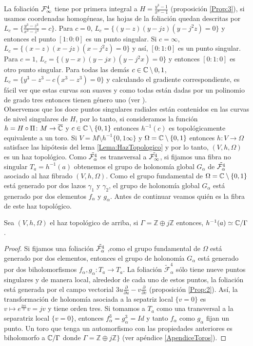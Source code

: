 La foliación $\Fol[4]{\infty}$ tiene por primera integral a $H=\tfrac{y^{3}-1}{x^{3}-1}$ (proposición \ref{Prop:3}), si usamos coordenadas homogéneas, las hojas de la foliación quedan descritas por $L_{c}=\{\tfrac{y^{3}-z^{3}}{x^{3}-z^{3}}=c\}$. Para $c=0$, $L_{c}=\{(y-z)(y-jz)(y-j^{2}z)=0\}$ y entonces el punto $[1:0:0]$ es un punto singular. Si $c=\infty$, $L_{c}=\{(x-z)(x-jz)(x-j^{2}z)=0\}$ y así, $[0:1:0]$ es un punto singular. Para $c=1$, $L_{c}=\{(y-x)(y-jx)(y-j^{2}x)=0\}$ y entonces $[0:1:0]$ es otro punto singular. Para todas las demás $c\in\C\setminus{0,1}$, $L_{c}=\{y^{3}-z^{3}-c(x^{3}-z^{3})=0\}$ y calculando el gradiente correspondiente, es fácil ver que estas curvas son suaves y como todas están dadas por un polinomio de grado tres entonces tienen género uno (ver \cite{FischerGerd}).\\

Observemos que los doce puntos singulares radiales están contenidos en las curvas de nivel singulares de $H$, por lo tanto, si consideramos la función $h=H\circ\Pi\colon M\rightarrow\overline{\C}$ y $c\in\C\setminus\{0,1\}$ entonces $h^{-1}(c)$ es topológicamente equivalente a un toro. Si $V=M\setminus h^{-1}\{0,1\infty\}$ y $\Omega=\C\setminus\{0,1\}$ entonces $h\colon V\rightarrow\Omega$ satisface las hipótesis del lema \ref{Lema:HazTopologico} y por lo tanto, $(V,h,\Omega)$ es un haz topológico. Como $\tilde{\Foli_{\alpha}^{4}}$ es transversal a $\tilde{\Foli_{\infty}^{4}}$, si fijamos una fibra no singular $T_{a}=h^{-1}(a)$ obtenemos el grupo de holonomía global $G_{\alpha}$ de $\tilde{\Foli_{\alpha}^{4}}$ asociado al haz fibrado $(V,h,\Omega)$. Como el grupo fundamental de $\Omega=\C\setminus\{0,1\}$ está generado por dos lazos $\gamma_{1}$ y $\gamma_{2}$, el grupo de holonomía global $G_{\alpha}$ está generado por dos elementos $f_{\alpha}$ y $g_{\alpha}$. Antes de continuar veamos quién es la fibra de este haz topológico.
\begin{Proposicion}
\label{Prop:FibraDelHaz}
Sea $(V,h,\Omega)$ el haz topológico de arriba, si $\Gamma=\mathbb{Z}\oplus j\mathbb{Z}$ entonces, $h^{-1}(a)\simeq\C/\Gamma$.
\end{Proposicion}
\begin{proof}
Si fijamos una foliación $\tilde{\Foli_{\alpha}^{4}}$ ,como el grupo fundamental de $\Omega$ está generado por dos elementos, entonces  el grupo de holonomía $G_{\alpha}$ está generado por dos biholomorfismos $f_{\alpha},g_{\alpha}\colon T_{a}\rightarrow T_{a}$. La foliación $\tilde{\mathcal{F}}_{\alpha}^{4}$ sólo tiene nueve puntos singulares y de manera local, alrededor de cada uno de estos puntos, la foliación está generada por el campo vectorial $3u\tfrac{\partial}{\partial u}-v\tfrac{\partial}{\partial v}$ (proposición \ref{Prop:2}). Así, la transformación de holonomía asociada a la sepatriz local $\{v=0\}$ es $v\mapsto e^{\tfrac{2\pi i}{3}}v=jv$ y tiene orden tres. Si tomamos a $T_{a}$ como una transversal a la separatriz local $\{v=0\}$, entonces $f_{\alpha}^{3}=g_{\alpha}^{3}=Id$ y tanto $f_{\alpha}$ como $g_{\alpha}$ fijan un punto. Un toro que tenga un automorfismo con las propiedades anteriores es biholomorfo a $\C/\Gamma$ donde $\Gamma=\mathbb{Z}\oplus j\mathbb{Z} \}$ (ver apéndice \ref{ApendiceToros}).
\end{proof}

